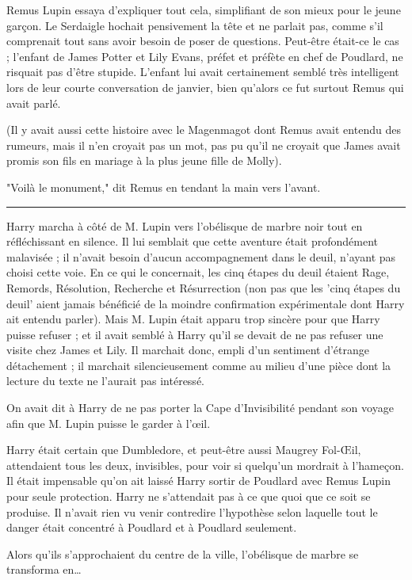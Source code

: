 Remus Lupin essaya d'expliquer tout cela, simplifiant de son mieux pour le jeune garçon. Le Serdaigle hochait pensivement la tête et ne parlait pas, comme s'il comprenait tout sans avoir besoin de poser de questions. Peut-être était-ce le cas ; l'enfant de James Potter et Lily Evans, préfet et préfète en chef de Poudlard, ne risquait pas d'être stupide. L'enfant lui avait certainement semblé très intelligent lors de leur courte conversation de janvier, bien qu'alors ce fut surtout Remus qui avait parlé.

(Il y avait aussi cette histoire avec le Magenmagot dont Remus avait entendu des rumeurs, mais il n'en croyait pas un mot, pas pu qu'il ne croyait que James avait promis son fils en mariage à la plus jeune fille de Molly).

"Voilà le monument," dit Remus en tendant la main vers l'avant.
\par\noindent\rule{\textwidth}{0.4pt}
Harry marcha à côté de M. Lupin vers l'obélisque de marbre noir tout en réfléchissant en silence. Il lui semblait que cette aventure était profondément malavisée ; il n'avait besoin d'aucun accompagnement dans le deuil, n'ayant pas choisi cette voie. En ce qui le concernait, les cinq étapes du deuil étaient Rage, Remords, Résolution, Recherche et Résurrection (non pas que les 'cinq étapes du deuil' aient jamais bénéficié de la moindre confirmation expérimentale dont Harry ait entendu parler). Mais M. Lupin était apparu trop sincère pour que Harry puisse refuser ; et il avait semblé à Harry qu'il se devait de ne pas refuser une visite chez James et Lily. Il marchait donc, empli d'un sentiment d'étrange détachement ; il marchait silencieusement comme au milieu d'une pièce dont la lecture du texte ne l'aurait pas intéressé.

On avait dit à Harry de ne pas porter la Cape d'Invisibilité pendant son voyage afin que M. Lupin puisse le garder à l'œil.

Harry était certain que Dumbledore, et peut-être aussi Maugrey Fol-Œil, attendaient tous les deux, invisibles, pour voir si quelqu'un mordrait à l'hameçon. Il était impensable qu'on ait laissé Harry sortir de Poudlard avec Remus Lupin pour seule protection. Harry ne s'attendait pas à ce que quoi que ce soit se produise. Il n'avait rien vu venir contredire l'hypothèse selon laquelle tout le danger était concentré à Poudlard et à Poudlard seulement.

Alors qu'ils s'approchaient du centre de la ville, l'obélisque de marbre se transforma en…

